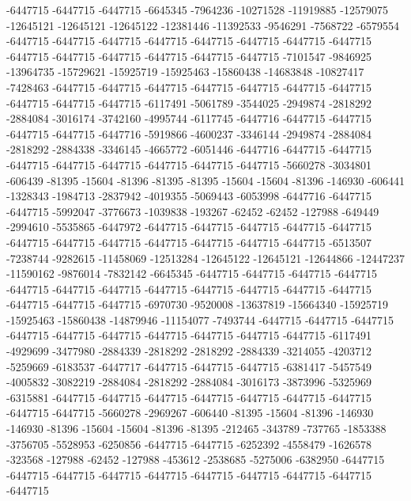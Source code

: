 -6447715 -6447715 -6447715 -6645345 -7964236 -10271528 -11919885 -12579075 -12645121 -12645121 -12645122 -12381446 -11392533 -9546291 -7568722 -6579554 -6447715 -6447715 -6447715 -6447715 -6447715 -6447715 -6447715 -6447715 -6447715 -6447715 -6447715 -6447715 -6447715 -6447715 -7101547 -9846925 -13964735 -15729621 -15925719 -15925463 -15860438 -14683848 -10827417 -7428463 -6447715 -6447715 -6447715 -6447715 -6447715 -6447715 -6447715 -6447715 -6447715 -6447715 -6117491 -5061789 -3544025 -2949874 -2818292 -2884084 -3016174 -3742160 -4995744 -6117745 -6447716 -6447715 -6447715 -6447715 -6447715 -6447716 -5919866 -4600237 -3346144 -2949874 -2884084 -2818292 -2884338 -3346145 -4665772 -6051446 -6447716 -6447715 -6447715 -6447715 -6447715 -6447715 -6447715 -6447715 -6447715 -5660278 -3034801 -606439 -81395 -15604 -81396 -81395 -81395 -15604 -15604 -81396 -146930 -606441 -1328343 -1984713 -2837942 -4019355 -5069443 -6053998 -6447716 -6447715 -6447715 -5992047 -3776673 -1039838 -193267 -62452 -62452 -127988 -649449 -2994610 -5535865 -6447972 -6447715 -6447715 -6447715 -6447715 -6447715 -6447715 -6447715 -6447715 -6447715 -6447715
-6447715 -6447715 -6513507 -7238744 -9282615 -11458069 -12513284 -12645122 -12645121 -12644866 -12447237 -11590162 -9876014 -7832142 -6645345 -6447715 -6447715 -6447715 -6447715 -6447715 -6447715 -6447715 -6447715 -6447715 -6447715 -6447715 -6447715 -6447715 -6447715 -6447715 -6970730 -9520008 -13637819 -15664340 -15925719 -15925463 -15860438 -14879946 -11154077 -7493744 -6447715 -6447715 -6447715 -6447715 -6447715 -6447715 -6447715 -6447715 -6447715 -6447715 -6117491 -4929699 -3477980 -2884339 -2818292 -2818292 -2884339 -3214055 -4203712 -5259669 -6183537 -6447717 -6447715 -6447715 -6447715 -6381417 -5457549 -4005832 -3082219 -2884084 -2818292 -2884084 -3016173 -3873996 -5325969 -6315881 -6447715 -6447715 -6447715 -6447715 -6447715 -6447715 -6447715 -6447715 -6447715 -5660278 -2969267 -606440 -81395 -15604 -81396 -146930 -146930 -81396 -15604 -15604 -81396 -81395 -212465 -343789 -737765 -1853388 -3756705 -5528953 -6250856 -6447715 -6447715 -6252392 -4558479 -1626578 -323568 -127988 -62452 -127988 -453612 -2538685 -5275006 -6382950 -6447715 -6447715 -6447715 -6447715 -6447715 -6447715 -6447715 -6447715 -6447715 -6447715
